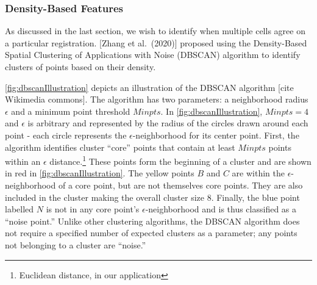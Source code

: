 \documentclass[
]{jdssv}
\begin{document}
\hypertarget{density-based-features}{%
\subsubsection{Density-Based Features}\label{density-based-features}}

As discussed in the last section, we wish to identify when multiple
cells agree on a particular registration. {[}Zhang et al.~(2020){]}
proposed using the Density-Based Spatial Clustering of Applications with
Noise (DBSCAN) algorithm to identify clusters of points based on their
density.

\autoref{fig:dbscanIllustration} depicts an illustration of the DBSCAN
algorithm {[}cite Wikimedia commons{]}. The algorithm has two
parameters: a neighborhood radius \(\epsilon\) and a minimum point
threshold \(Minpts\). In \autoref{fig:dbscanIllustration},
\(Minpts = 4\) and \(\epsilon\) is arbitrary and represented by the
radius of the circles drawn around each point - each circle represents
the \(\epsilon\)-neighborhood for its center point. First, the algorithm
identifies cluster ``core'' points that contain at least \(Minpts\)
points within an \(\epsilon\)
distance.\footnote{Euclidean distance, in our application} These points
form the beginning of a cluster and are shown in red in
\autoref{fig:dbscanIllustration}. The yellow points \(B\) and \(C\) are
within the \(\epsilon\)-neighborhood of a core point, but are not
themselves core points. They are also included in the cluster making the
overall cluster size 8. Finally, the blue point labelled \(N\) is not in
any core point's \(\epsilon\)-neighborhood and is thus classified as a
``noise point.'' Unlike other clustering algorithms, the DBSCAN
algorithm does not require a specified number of expected clusters as a
parameter; any points not belonging to a cluster are ``noise.''
\end{document}
